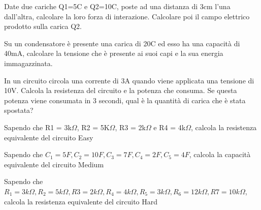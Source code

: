 \documentclass[addpoints]{exam}
\begin{document}
 
\begin{center}
\end{center}

\vspace{5mm}

 
\vspace{10mm}



\begin{questions}

\question[1] Date due cariche Q1=5C e Q2=10C, poste ad una distanza di 3cm l’una dall’altra, calcolare la loro forza di interazione. Calcolare poi il campo elettrico prodotto sulla carica Q2.

\question[1] Su un condensatore è presente una carica di 20C ed esso ha una capacità di 40mA, calcolare la tensione che è presente ai suoi capi e la sua energia immagazzinata.

\question[2] In un circuito circola una corrente di 3A quando viene applicata una tensione di 10V. Calcola la resistenza del circuito e la potenza che consuma. Se questa potenza viene consumata in 3 secondi, qual è la quantità di carica che è stata spostata?

\question[2] Sapendo che R1 = 3k$\Omega$, R2 = 5K$\Omega$, R3 = 2k$\Omega$ e R4 = 4k$\Omega$, calcola la resistenza equivalente del circuito Easy

\question[2] Sapendo che $C_1=5F, C_2=10F, C_3=7F, C_4=2F, C_5=4F$, calcola la capacità equivalente del circuito Medium

\question[2] Sapendo che $R_1=3k \Omega, R_2=5k \Omega, R3=2k \Omega, R_4=4k \Omega, R_5=3k \Omega, R_6=12k \Omega, R7=10k \Omega$, calcola la resistenza equivalente del circuito Hard

\end{questions}
\end{document}
